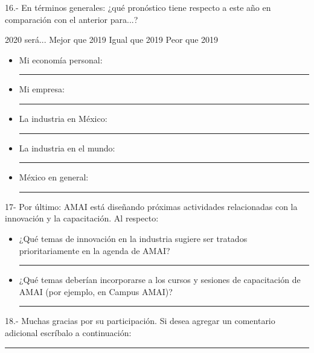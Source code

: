 16.- En términos generales: ¿qué pronóstico tiene respecto a este año en comparación con el anterior para...?

2020 será... 
Mejor que 2019 Igual que 2019 Peor que 2019
\begin{itemize}
    \item Mi economía personal: \rule{20mm}{0.1mm}
    \item Mi empresa: \rule{20mm}{0.1mm}
    \item La industria en México: \rule{20mm}{0.1mm}
    \item La industria en el mundo: \rule{20mm}{0.1mm}
    \item México en general: \rule{20mm}{0.1mm}
\end{itemize}

17- Por último: AMAI está diseñando próximas actividades relacionadas con la innovación y la capacitación. Al respecto:
\begin{itemize}
    \item ¿Qué temas de innovación en la industria sugiere ser tratados prioritariamente en la agenda de AMAI? \rule{20mm}{0.1mm}
\item ¿Qué temas deberían incorporarse a los cursos y sesiones de capacitación de AMAI (por ejemplo, en Campus AMAI)? \rule{20mm}{0.1mm}

\end{itemize}

18.- Muchas gracias por su participación. Si desea agregar un comentario adicional escríbalo a continuación: \rule{20mm}{0.1mm}